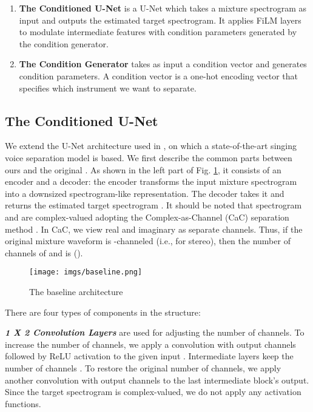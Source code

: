 \documentclass{article}
\begin{document}
\begin{enumerate}
    \item \textbf{The Conditioned U-Net} is a U-Net  \cite{medical_unet} which takes a mixture spectrogram as input and outputs the estimated target spectrogram. It applies FiLM layers to modulate intermediate features with condition parameters generated by the condition generator.
    \item \textbf{The Condition Generator} takes as input a condition vector and generates condition parameters. A condition vector is a one-hot encoding vector that specifies which instrument we want to separate.
\end{enumerate}


\subsection{The Conditioned U-Net}
We extend the U-Net architecture used in \cite{tfctdf}, on which a state-of-the-art singing voice separation model is based.
We first describe the common parts between ours and the original \cite{tfctdf}.
As shown in the left part of Fig. \ref{fig:baseline}, it consists of an encoder and a decoder: the encoder transforms the input mixture spectrogram  into a downsized spectrogram-like representation. The decoder takes it and returns the estimated target spectrogram .
It should be noted that spectrogram  and  are complex-valued adopting the Complex-as-Channel (CaC) separation method \cite{tfctdf}.
In CaC, we view real and imaginary as separate channels. Thus, if the original mixture waveform is -channeled  (i.e.,  for stereo), then the number of channels of  and  is ().


\begin{figure}[htb]


  \centering
  {\texttt{[image: imgs/baseline.png]}}

    \caption{The baseline architecture}
    \label{fig:baseline}
\end{figure}

\noindent
There are four types of components in the structure:


\noindent
\textbf{\textit{1 X 2 Convolution Layers}} are used for adjusting the number of channels. To increase the number of channels, we apply a  convolution with  output channels followed by ReLU \cite{relu} activation to the given input . Intermediate layers keep the number of channels .
To restore the original number of channels, we apply another  convolution with  output channels to the last intermediate block's output. Since the target spectrogram is complex-valued, we do not apply any activation functions.
\end{document}
